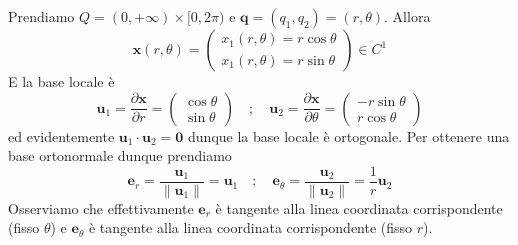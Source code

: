 \begin{example}
    Prendiamo \(Q = {(0, +\infty)} \times  [0, 2\pi)\) e \(\mathbf{q} = {(q_{1},
    q_{2})} = {(r, \theta)}\). Allora 
    \[
      \mathbf{x} {(r, \theta)} = \begin{pmatrix}
          x_{1}{(r, \theta)}=r \cos \theta \\
          x_{1}{(r, \theta)}=r \sin \theta
      \end{pmatrix} \in C^{1}
    \]
    E la base locale è 
    \[
        \mathbf{u}_1 = \frac{\partial \mathbf{x} }{\partial r} = \begin{pmatrix}
            \cos \theta \\
            \sin \theta
        \end{pmatrix} \quad ; \quad \mathbf{u}_2 = \frac{\partial \mathbf{x}}{\partial \theta} = \begin{pmatrix}
            -r \sin \theta \\
            r \cos \theta
        \end{pmatrix}
    \]
    ed evidentemente \(\mathbf{u}_1 \cdot \mathbf{u}_2 = \mathbf{0} \) dunque la base
    locale è ortogonale. Per ottenere una base ortonormale dunque prendiamo
    \[
      \mathbf{e}_r = \frac{\mathbf{u}_1}{\|\mathbf{u}_1\|} = \mathbf{u}_1 \quad
      ; \quad \mathbf{e}_\theta = \frac{\mathbf{u}_2}{\|\mathbf{u}_2\|} =
      \frac{1}{r} \mathbf{u}_2 
    \]
    Osserviamo che effettivamente \(\mathbf{e}_r\) è tangente alla linea
    coordinata corrispondente (fisso \(\theta\)) e \(\mathbf{e}_\theta\) è
    tangente alla linea coordinata corrispondente (fisso \(r\)).
\end{example}
